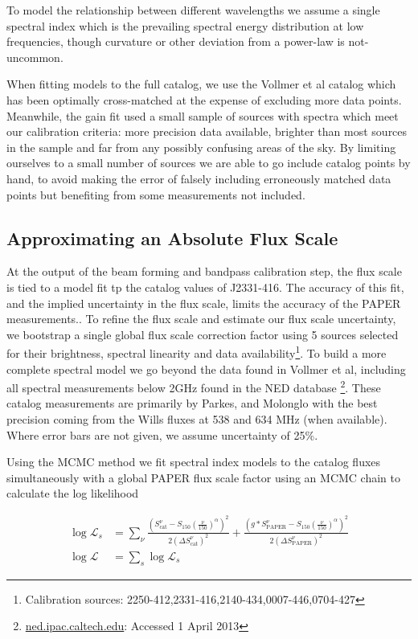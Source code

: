 \documentclass[preprint]{aastex}
\newcommand{\PAPER}{\mathrm{PAPER}}
\begin{document}
To model the relationship between different wavelengths we assume a single spectral index
which is the prevailing spectral energy distribution at low frequencies, 
though curvature or other
deviation from a power-law is not-uncommon.  

When fitting models to the full catalog, we use the Vollmer et al
catalog which has been optimally cross-matched at the expense of excluding more data points.
Meanwhile, the gain fit used a small sample of
sources with spectra which meet our calibration criteria: more precision data available,
brighter than most sources in the sample and far from any possibly confusing areas of
the sky. 
By limiting ourselves to a small number of sources we are able to go include catalog points by hand,
to avoid making the error of falsely including erroneously matched 
data points but benefiting from some measurements not included. 


\subsection{Approximating an Absolute Flux Scale}
\label{sec:flux_scale}

At the output of the beam forming and bandpass calibration step, the flux scale
 is tied to a model fit tp the catalog values of
J2331-416. The accuracy of this fit, and the implied uncertainty in the flux
scale, limits the accuracy of the PAPER measurements..  To refine the flux
scale and estimate our flux scale uncertainty, we bootstrap a single global flux scale 
correction factor using 5
sources selected for their brightness, spectral linearity and data
availability\footnote{Calibration sources:
2250-412,2331-416,2140-434,0007-446,0704-427}. To build a more complete
spectral model we go beyond the data found in Vollmer et al, including all spectral
measurements below 2GHz found in the NED database \footnote{\url{ned.ipac.caltech.edu}: Accessed 1 April 2013}.  These catalog measurements
are primarily by Parkes, and Molonglo with the best precision coming from the
Wills fluxes at 538 and 634 MHz (when available). Where error bars are not
given, we assume uncertainty of 25\%. 

Using the MCMC method we fit spectral index models to the catalog fluxes
 simultaneously with a global PAPER flux scale factor using  an MCMC chain to calculate the log likelihood

\begin{align}
\log\mathcal{L}_s &= \sum_{\nu}\frac{ (S_\textrm{cat}^{\nu}  - S_{150}  \left(\frac{\nu}{150}\right)^\alpha)^2}{2(\Delta S_\textrm{cat}^\nu)^2} +
\frac{ (g*S_\PAPER^{\nu}  - S_{150}\left(\frac{\nu}{150}\right)^\alpha)^2}{2(\Delta S_\PAPER^\nu)^2}\\
\log\mathcal{L} &= \sum_{s} \log\mathcal{L}_s
\end{align}
\end{document}

